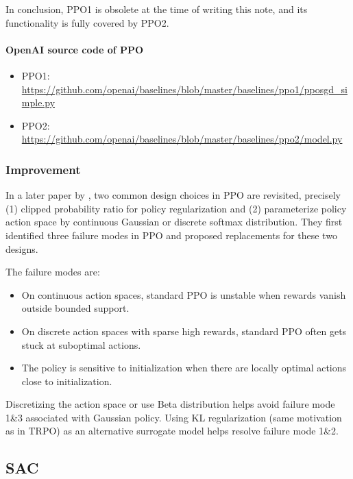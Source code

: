 \documentclass[lang=en,mode=normal,device=normal,color=blue,12pt]{elegantnote}
\DeclareMathOperator*{\1}{\mathbbm{1}}
\begin{document}
In conclusion, PPO1 is obsolete at the time of writing this note, and its functionality is fully covered by PPO2.


\paragraph{OpenAI source code of PPO}

\begin{itemize}
\item PPO1: \url{https://github.com/openai/baselines/blob/master/baselines/ppo1/pposgd_simple.py}
\item PPO2: \url{https://github.com/openai/baselines/blob/master/baselines/ppo2/model.py}
\end{itemize}

\subsubsection{Improvement}

In a later paper by \cite{hsu2020revisiting}, two common design choices in PPO are revisited, precisely (1) clipped probability ratio for policy regularization and (2) parameterize policy action space by continuous Gaussian or discrete softmax distribution. They first identified three failure modes in PPO and proposed replacements for these two designs.

The failure modes are:
\begin{itemize}
\item On continuous action spaces, standard PPO is unstable when rewards vanish outside bounded support.
\item On discrete action spaces with sparse high rewards, standard PPO often gets stuck at suboptimal actions.
\item The policy is sensitive to initialization when there are locally optimal actions close to initialization.
\end{itemize}


Discretizing the action space or use Beta distribution helps avoid failure mode 1\&3 associated with Gaussian policy. Using KL regularization (same motivation as in TRPO) as an alternative surrogate model helps resolve failure mode 1\&2.



\newpage
\subsection{SAC}
\end{document}
